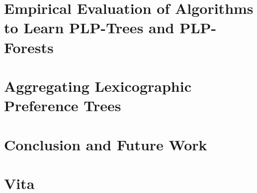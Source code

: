 \documentclass[final]{ukthesis}
\begin{document}
\chapter{Empirical Evaluation of Algorithms to Learn PLP-Trees and PLP-Forests\label{ch:PLPTF}}

\copyrightnotice

\chapter{Aggregating Lexicographic Preference Trees\label{ch:aggLP}}

\copyrightnotice

%

\chapter{Conclusion and Future Work\label{ch:summary}}

\copyrightnotice


\backmatter
\singlespacing



\doublespacing
\chapter{Vita}

\copyrightnotice
\end{document}
